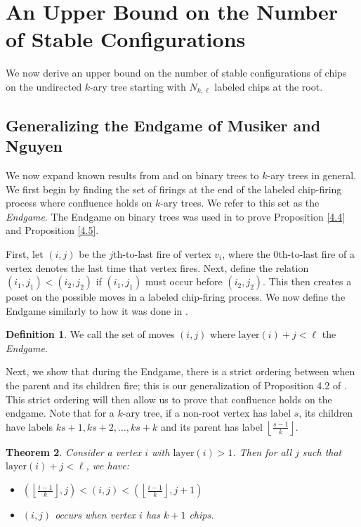 \documentclass[11pt]{article}
\newtheorem{theorem}{Theorem}[section]
\theoremstyle{remark}
\theoremstyle{definition}
\newtheorem{definition}[theorem]{Definition}
\begin{document}
\section{An Upper Bound on the Number of Stable Configurations}\label{sec:UpperBounds}

We now derive an upper bound on the number of stable configurations of chips on the undirected $k$-ary tree starting with $N_{k, \ell}$ labeled chips at the root.

\subsection{Generalizing the Endgame of Musiker and Nguyen}

We now expand known results from \cite{inagaki2024chipfiringundirectedbinarytrees} and \cite{MR4827886} on binary trees to $k$-ary trees in general. We first begin by finding the set of firings at the end of the labeled chip-firing process where confluence holds on $k$-ary trees. We refer to this set as the \textit{Endgame}. The Endgame on binary trees was used in \cite{MR4827886} to prove Proposition \ref{4.4} and Proposition \ref{4.5}.

First, let $(i, j)$ be the $j$th-to-last fire of vertex $v_i$, where the 0th-to-last fire of a vertex denotes the last time that vertex fires. Next, define the relation $(i_1, j_1) <  (i_2, j_2)$ if $(i_1, j_1)$ must occur before $(i_2, j_2)$. This then creates a poset on the possible moves in a labeled chip-firing process. We now define the Endgame similarly to how it was done in \cite{MR4827886}.

\begin{definition}
We call the set of moves $(i,j)$ where $\mathrm{layer}(i)+j < \ell$ the \textit{Endgame}.
\end{definition}

Next, we show that during the Endgame, there is a strict ordering between when the parent and its children fire; this is our generalization of Proposition 4.2 of \cite{MR4827886}. This strict ordering will then allow us to prove that confluence holds on the endgame. Note that for a $k$-ary tree, if a non-root vertex has label $s$, its children have labels $ks+1, ks+2, \ldots, ks+k$ and its parent has label $\left \lfloor \frac {s-1} k\right \rfloor$.

\begin{theorem}\label{thm:Endgame}
Consider a vertex $i$ with $\mathrm{layer}(i) > 1$. Then for all $j$ such that $\mathrm{layer}(i)+j < \ell$, we have:

\begin{itemize}
    \item $\left( \left \lfloor \frac {i-1} k\right \rfloor, j \right) < (i,j) < \left( \left \lfloor \frac {i-1} k\right \rfloor, j+1 \right)$
    \item $(i,j)$ occurs when vertex $i$ has $k+1$ chips.
\end{itemize}
\end{theorem}
\end{document}

